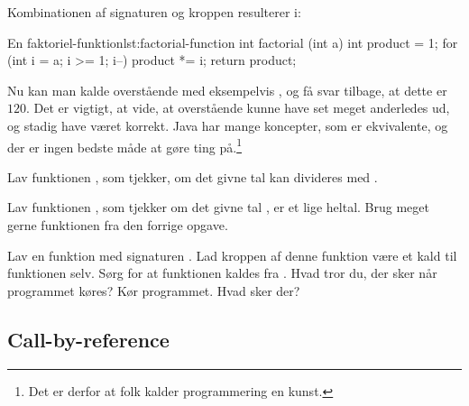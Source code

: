 		Kombinationen af signaturen og kroppen resulterer i:

		\begin{JavaCode}{En faktoriel-funktion}{lst:factorial-function}
			int factorial (int a) {
				int product = 1;
				for (int i = a; i >= 1; i--)
					product *= i;
				return product;
			}
		\end{JavaCode}

        Nu kan man kalde overstående med eksempelvis
        , og få svar tilbage, at dette er
        \(120\). Det er vigtigt, at vide, at overstående kunne have set
        meget anderledes ud, og stadig have været korrekt. Java har
        mange koncepter, som er ekvivalente, og der er ingen bedste
        måde at gøre ting på.\footnote{Det er derfor at folk kalder
        programmering en kunst.}

        \begin{exercise}
            Lav funktionen ,
            som tjekker, om det givne tal  kan
            divideres med .
        \end{exercise}

        \begin{exercise}
            Lav funktionen , som
            tjekker om det givne tal , er et lige
            heltal.  Brug meget gerne funktionen
             fra den forrige opgave.
        \end{exercise}

        \begin{exercise}
            Lav en funktion med signaturen . Lad
            kroppen af denne funktion være et kald til funktionen
            selv. Sørg for at funktionen kaldes fra .
            Hvad tror du, der sker når programmet køres? Kør
            programmet. Hvad sker der?
        \end{exercise}

    \subsection{Call-by-reference}


